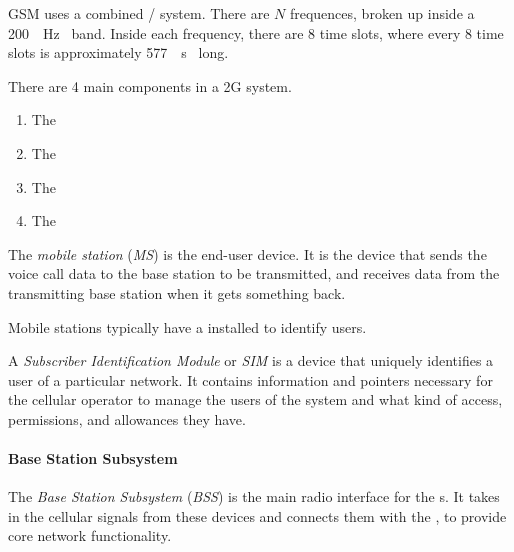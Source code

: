 GSM uses a combined / system.
There are $N$ frequences, broken up inside a \SI{200}{\kilo{} \hertz{}} band.
Inside each frequency, there are 8 time slots, where every 8 time slots is approximately \SI{577}{\micro{} \second{}} long.

There are 4 main components in a 2G system.
\begin{enumerate}[noitemsep]
\item The 
\item The 
\item The 
\item The 
\end{enumerate}

\begin{definition}\label{def:Mobile_Station}
  The \emph{mobile station} (\emph{MS}) is the end-user device.
  It is the device that sends the voice call data to the base station to be transmitted, and receives data from the transmitting base station when it gets something back.

  Mobile stations typically have a  installed to identify users.
\end{definition}

\begin{definition}\label{def:SIM}
  A \emph{Subscriber Identification Module} or \emph{SIM} is a device that uniquely identifies a user of a particular network.
  It contains information and pointers necessary for the cellular operator to manage the users of the system and what kind of access, permissions, and allowances they have.
\end{definition}

\paragraph{Base Station Subsystem}\label{par:Base_Station_Subsystem}
\begin{definition}\label{def:Base_Station_Subsystem}
  The \emph{Base Station Subsystem} (\emph{BSS}) is the main radio interface for the s.
  It takes in the cellular signals from these devices and connects them with the , to provide core network functionality.
\end{definition}


